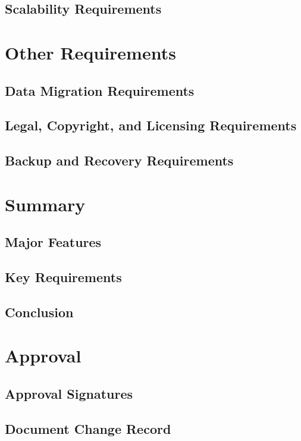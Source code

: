         \section{Scalability Requirements}
            
    \newpage        
    \chapter{Other Requirements}\label{Other Requirements}
        \section{Data Migration Requirements}
            
        \section{Legal, Copyright, and Licensing Requirements}
            
        \section{Backup and Recovery Requirements}
            

    \newpage
    \chapter{Summary}
        
        \section{Major Features}
            
        \section{Key Requirements}
            
        \section{Conclusion}
            
            
    \newpage
    \chapter{Approval}
        
        \section{Approval Signatures}
            
        \section{Document Change Record}
            
